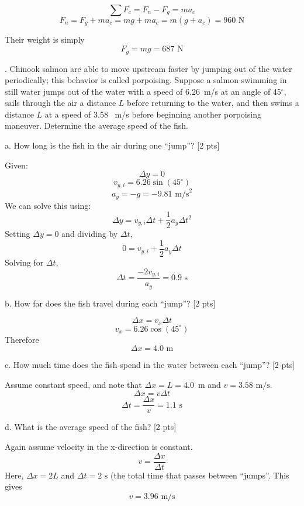 \documentclass[11pt,letterpaper]{article}
\newcommand{\sol}[1]{{\color{NavyBlue} #1}}
\begin{document}
\sol{
$$\sum F_c = F_n - F_g = ma_c$$
$$F_n = F_g + ma_c = mg+ma_c = m(g+a_c) = \boxed{960\mbox{ N}}$$

Their weight is simply 
$$F_g = mg = \boxed{687\mbox{ N}}$$

}




. Chinook salmon are able to move upstream faster by jumping out of the water periodically; this behavior is called porpoising. Suppose a salmon swimming in still water jumps out of the water with a speed of 6.26~m/s at an angle of 45$^\circ$, sails through the air a distance $L$ before returning to the water, and then swims a distance $L$ at a speed of 3.58~ m/s before beginning another porpoising maneuver. Determine the average speed of the fish. 

a. How long is the fish in the air during one ``jump''? [2 pts]

\sol{
Given:
$$\Delta y = 0$$
$$v_{y,i} = 6.26\sin(45^\circ)$$
$$a_y = -g = -9.81\mbox{ m/s}^2$$
We can solve this using:
$$\Delta y = v_{y,i}\Delta t + \frac{1}{2}a_y\Delta t^2$$
Setting $\Delta y=0$ and dividing by $\Delta t$,
$$0 = v_{y,i} + \frac{1}{2}a_y\Delta t$$
Solving for $\Delta t$,
$$\Delta t = \frac{-2v_{y,i}}{a_y} = \boxed{0.9\mbox{ s}}$$
}
\vspace{2cm}

b. How far does the fish travel during each ``jump''? [2 pts]

\sol{
$$\Delta x = v_x\Delta t$$
$$v_x = 6.26\cos(45^\circ)$$
Therefore
$$\Delta x = \boxed{4.0\mbox{ m}}$$
} 
\vspace{1cm}

c. How much time does the fish spend in the water between each ``jump''? [2 pts]

\sol{Assume constant speed, and note that $\Delta x = L=4.0$~m and $v=3.58\mbox{ m/s}$.
$$\Delta x = v\Delta t$$
$$\Delta t = \frac{\Delta x}{v} = \boxed{1.1\mbox{ s}}$$
}
\vspace{1cm}

d. What is the average speed of the fish? [2 pts]

\sol{Again assume velocity in the x-direction is constant.
$$v = \frac{\Delta x}{\Delta t}$$
Here, $\Delta x = 2L$ and $\Delta t = 2\mbox{ s}$ (the total time that passes between ``jumps''. This gives
$$\boxed{v = 3.96\mbox{ m/s}}$$
}
\end{document}
